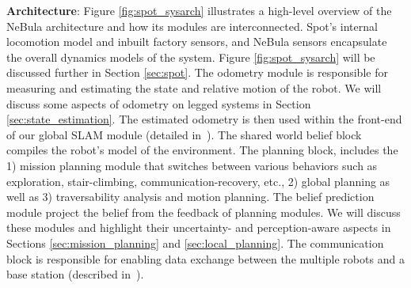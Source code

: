 \documentclass[letterpaper, 10pt, conference]{ieeeconf}      %
\newcommand{\ph}[1]{{\textbf{#1}:}} %
\newcommand{\rev}[1]{{\color{blue}#1}} %
\begin{document}
\ph{Architecture} %
Figure \ref{fig:spot_sysarch} illustrates a high-level overview of the NeBula architecture and how its modules are interconnected. 
Spot's internal locomotion model and inbuilt factory sensors, and NeBula sensors encapsulate the overall dynamics models of the system.
\rev{Figure \ref{fig:spot_sysarch} will be discussed further in Section \ref{sec:spot}.}
The odometry module \rev{is responsible for measuring and estimating the state and relative motion of the robot.}
We will discuss some aspects of odometry on legged systems in Section \ref{sec:state_estimation}. 
The estimated odometry is then used within the front-end of our global SLAM \rev{module} (detailed in~\cite{Ebadi2020}). 
\rev{The shared world belief block compiles the robot's model of the environment.}
The planning block, includes the 1) mission planning module that switches between various behaviors \rev{such as} exploration, stair-climbing, communication-recovery, etc., 2) global planning \rev{as well as} 3) \rev{traversability analysis and motion planning.} 
\rev{The belief prediction module project the belief from the feedback of planning modules.}
We will discuss these modules and highlight their uncertainty- and perception-aware aspects in Sections \ref{sec:mission_planning} and \ref{sec:local_planning}. 
The communication block is responsible for enabling data exchange between the multiple robots and a base station \rev{(described in~\cite{Otsu2020})}. 

\end{document}
